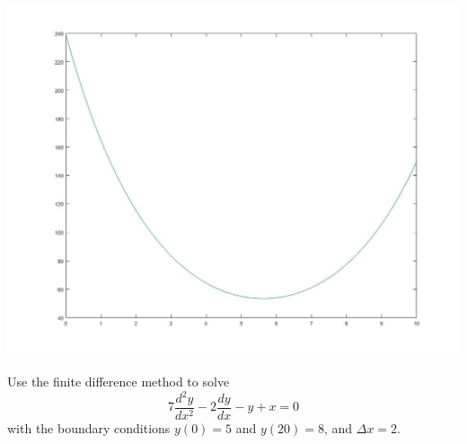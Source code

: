 \documentclass{article}
\begin{document}
\begin{solution}
\includegraphics[width=\linewidth]{HW11-TriDiag.jpg}

\end{solution}

\setcounter{problem}{3}
\begin{problem}
Use the finite difference method to solve 
\[ 7\frac{d^{2}y}{dx^{2}} -2\frac{dy}{dx} -y +x =0 \]
with the boundary conditions $y(0)=5$ and $y(20)=8$, and $\Delta x=2$.
\end{problem}
\end{document}

